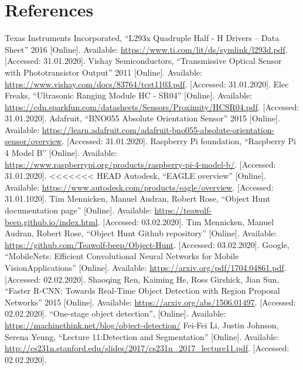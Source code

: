 \newpage

\section{References}
\begin{flushleft}
\begin{thebibliography}{99}
 Texas Instruments Incorporated, ``L293x Quadruple Half - H Drivers -- Data Sheet'' 2016 [Online]. Available: \url{https://www.ti.com/lit/ds/symlink/l293d.pdf}. [Accessed: 31.01.2020].
 Vishay Semiconductors, ``Transmissive Optical Sensor with Phototransistor Output'' 2011 [Online]. Available: \url{https://www.vishay.com/docs/83764/tcst1103.pdf}. [Accessed: 31.01.2020].
 Elec Freaks, ``Ultrasonic Ranging Module HC - SR04'' [Online]. Available: \url{https://cdn.sparkfun.com/datasheets/Sensors/Proximity/HCSR04.pdf}. [Accessed: 31.01.2020].
 Adafruit, ``BNO055 Absolute Orientation Sensor'' 2015 [Online]. Available: \url{https://learn.adafruit.com/adafruit-bno055-absolute-orientation-sensor/overview}. [Accessed: 31.01.2020].
 Raspberry Pi foundation, ``Raspberry Pi 4 Model B'' [Online]. Available: \url{https://www.raspberrypi.org/products/raspberry-pi-4-model-b/}. [Accessed: 31.01.2020].
<<<<<<< HEAD
 Autodesk, ``EAGLE overview'' [Online]. Available: \url{https://www.autodesk.com/products/eagle/overview}. [Accessed: 31.01.1020].
 Tim Mennicken, Manuel Audran, Robert Rose, ``Object Hunt documentation page'' [Online]. Available: \url{https://teawolf-beep.github.io/index.html}. [Accessed: 03.02.2020].
 Tim Mennicken, Manuel Audran, Robert Rose, ``Object Hunt Github repository'' [Online]. Available: \url{https://github.com/Teawolf-beep/Object-Hunt}. [Accessed: 03.02.2020].
 Google, ``MobileNets: Efficient Convolutional Neural Networks for Mobile VisionApplications'' [Online]. Available: \url{https://arxiv.org/pdf/1704.04861.pdf}. [Accessed: 02.02.2020].
 Shaoqing Ren, Kaiming He, Ross Girshick, Jian Sun, ``Faster R-CNN: Towards Real-Time Object Detection with Region Proposal Networks'' 2015 [Online]. Available: \url{https://arxiv.org/abs/1506.01497}. [Accessed: 02.02.2020].
 ``One-stage object detection'', [Online]. Available: \url{https://machinethink.net/blog/object-detection/}
 Fei-Fei Li, Justin Johnson, Serena Yeung, ``Lecture 11:Detection and Segmentation'' [Online]. Available: \url{http://cs231n.stanford.edu/slides/2017/cs231n_2017_lecture11.pdf}. [Accessed: 02.02.2020].

\end{thebibliography}
\end{flushleft}

